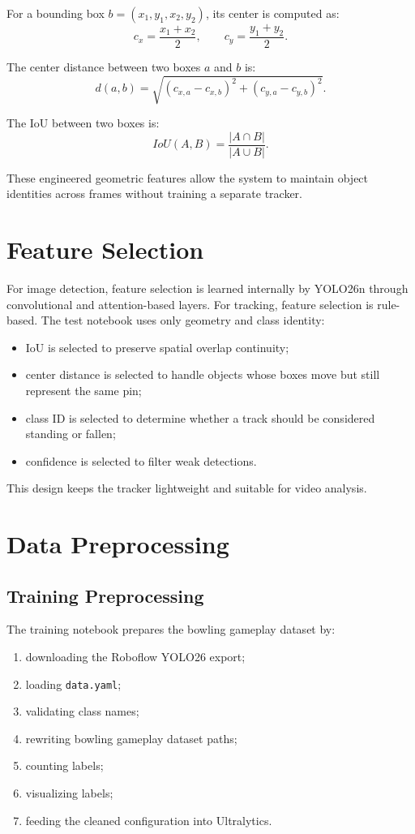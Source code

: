 \documentclass[12pt,a4paper]{article}
\begin{document}
For a bounding box \(b=(x_1,y_1,x_2,y_2)\), its center is computed as:
\[
c_x = \frac{x_1+x_2}{2}, \qquad c_y = \frac{y_1+y_2}{2}.
\]

The center distance between two boxes \(a\) and \(b\) is:
\[
d(a,b) = \sqrt{(c_{x,a}-c_{x,b})^2 + (c_{y,a}-c_{y,b})^2}.
\]

The IoU between two boxes is:
\[
IoU(A,B)=\frac{|A\cap B|}{|A\cup B|}.
\]

These engineered geometric features allow the system to maintain object identities across frames without training a separate tracker.

\section{Feature Selection}

For image detection, feature selection is learned internally by YOLO26n through convolutional and attention-based layers. For tracking, feature selection is rule-based. The test notebook uses only geometry and class identity:
\begin{itemize}[noitemsep]
    \item IoU is selected to preserve spatial overlap continuity;
    \item center distance is selected to handle objects whose boxes move but still represent the same pin;
    \item class ID is selected to determine whether a track should be considered standing or fallen;
    \item confidence is selected to filter weak detections.
\end{itemize}

This design keeps the tracker lightweight and suitable for video analysis.

\section{Data Preprocessing}

\subsection{Training Preprocessing}

The training notebook prepares the bowling gameplay dataset by:
\begin{enumerate}[noitemsep]
    \item downloading the Roboflow YOLO26 export;
    \item loading \texttt{data.yaml};
    \item validating class names;
    \item rewriting bowling gameplay dataset paths;
    \item counting labels;
    \item visualizing labels;
    \item feeding the cleaned configuration into Ultralytics.
\end{enumerate}
\end{document}
